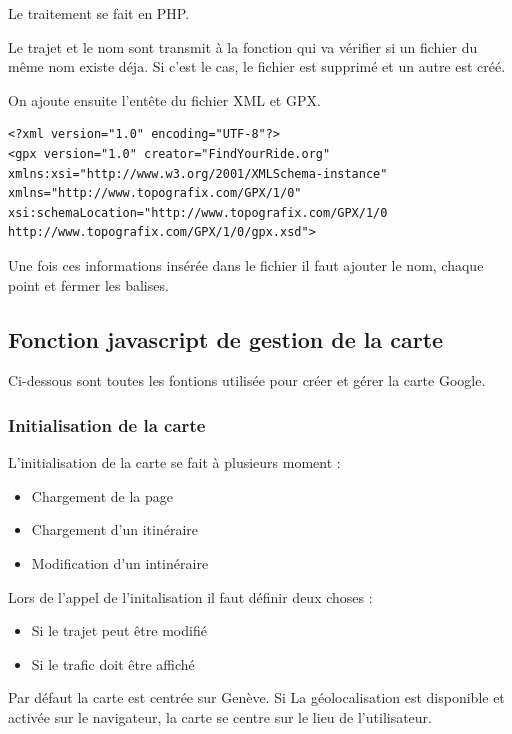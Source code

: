 \documentclass[a4paper]{article}
\newcommand{\diag}[1]{}
\begin{document}
Le traitement se fait en PHP.

Le trajet et le nom sont transmit à la fonction qui va  vérifier si un fichier du même nom existe déja. Si c'est le cas, le fichier est supprimé et un autre est créé. 

On ajoute ensuite l'entête du fichier XML et GPX.

\lstset{language=XML}
\begin{lstlisting}[frame=single] 
<?xml version="1.0" encoding="UTF-8"?>
<gpx version="1.0" creator="FindYourRide.org" xmlns:xsi="http://www.w3.org/2001/XMLSchema-instance" xmlns="http://www.topografix.com/GPX/1/0" xsi:schemaLocation="http://www.topografix.com/GPX/1/0 http://www.topografix.com/GPX/1/0/gpx.xsd">
\end{lstlisting}

Une fois ces informations insérée dans le fichier il faut ajouter le nom, chaque point et fermer les balises.

\begin{center}
	\diag{PathToGpx}
\end{center}


\subsection{Fonction javascript de gestion de la carte}
Ci-dessous sont toutes les fontions utilisée pour créer et gérer la carte Google.

\subsubsection{Initialisation de la carte}
L'initialisation de la carte se fait à plusieurs moment : 
\begin{itemize}
	\item Chargement de la page
	\item Chargement d'un itinéraire
	\item Modification d'un intinéraire
\end{itemize}

Lors de l'appel de l'initalisation il faut définir deux choses :
\begin{itemize}
	\item Si le trajet peut être modifié
	\item Si le trafic doit être affiché
\end{itemize}

Par défaut la carte est centrée sur Genève. Si La géolocalisation est disponible et activée sur le navigateur, la carte se centre sur le lieu de l'utilisateur.
\end{document}
